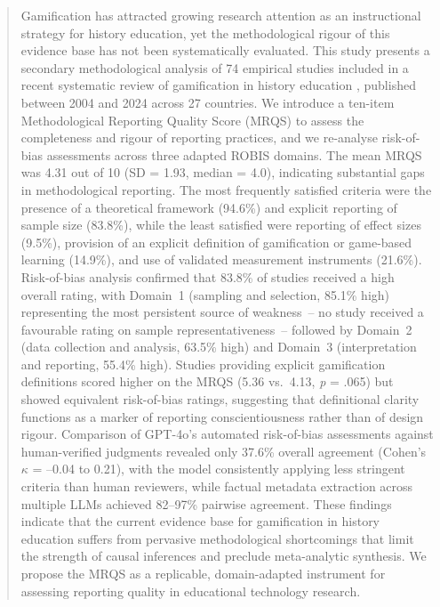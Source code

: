 \documentclass[etq]{acnsart}
\begin{document}
	\begin{abstract}
		Gamification has attracted growing research attention as an instructional strategy for history education, yet the methodological rigour of this evidence base has not been systematically evaluated. This study presents a secondary methodological analysis of 74 empirical studies included in a recent systematic review of gamification in history education \cite{KorniienkoSemerikov2024}, published between 2004 and 2024 across 27 countries. We introduce a ten-item Methodological Reporting Quality Score (MRQS) to assess the completeness and rigour of reporting practices, and we re-analyse risk-of-bias assessments across three adapted ROBIS domains. The mean MRQS was 4.31 out of 10 (SD = 1.93, median = 4.0), indicating substantial gaps in methodological reporting. The most frequently satisfied criteria were the presence of a theoretical framework (94.6\%) and explicit reporting of sample size (83.8\%), while the least satisfied were reporting of effect sizes (9.5\%), provision of an explicit definition of gamification or game-based learning (14.9\%), and use of validated measurement instruments (21.6\%). Risk-of-bias analysis confirmed that 83.8\% of studies received a high overall rating, with Domain~1 (sampling and selection, 85.1\% high) representing the most persistent source of weakness~-- no study received a favourable rating on sample representativeness~-- followed by Domain~2 (data collection and analysis, 63.5\% high) and Domain~3 (interpretation and reporting, 55.4\% high). Studies providing explicit gamification definitions scored higher on the MRQS (5.36 vs.\ 4.13, \textit{p} = .065) but showed equivalent risk-of-bias ratings, suggesting that definitional clarity functions as a marker of reporting conscientiousness rather than of design rigour. Comparison of GPT-4o's automated risk-of-bias assessments against human-verified judgments revealed only 37.6\% overall agreement (Cohen's $\kappa$ = --0.04 to 0.21), with the model consistently applying less stringent criteria than human reviewers, while factual metadata extraction across multiple LLMs achieved 82--97\% pairwise agreement. These findings indicate that the current evidence base for gamification in history education suffers from pervasive methodological shortcomings that limit the strength of causal inferences and preclude meta-analytic synthesis. We propose the MRQS as a replicable, domain-adapted instrument for assessing reporting quality in educational technology research.
	\end{abstract}
	
\end{document}

